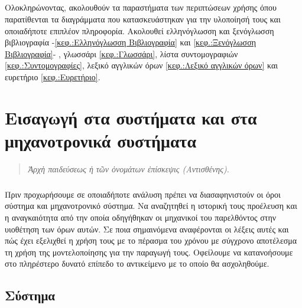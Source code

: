 \documentclass[a4paper,12pt,twoside]{report}
\begin{document}
		\paragraph{} {Ολοκληρώνοντας, ακολουθούν τα παραστήματα των περιπτώσεων χρήσης όπου παρατίθενται τα διαγράμματα που κατασκευάστηκαν για την υλοποίησή τους και οποιαδήποτε επιπλέον πληροφορία. Ακολουθεί ελληνόγλωσση και ξενόγλωσση βιβλιογραφία -\ref{κεφ.:Ελληνόγλωσση Βιβλιογραφία} και \ref{κεφ.:Ξενόγλωσση Βιβλιογραφία}- , γλωσσάρι \ref{κεφ.:Γλωσσάρι}, λίστα συντομογραφιών \ref{κεφ.:Συντομογραφίες}, λεξικό αγγλικών όρων \ref{κεφ.:Λεξικό αγγλικών όρων} και ευρετήριο \ref{κεφ.:Ευρετήριο}.
		}

	\chapter{Εισαγωγή στα συστήματα και στα μηχανοτρονικά συστήματα}
		\label{κεφ.:Εισαγωγή στα συστήματα και στα μηχανοτρονικά συστήματα}
		
		\begin{quote}
			\textit{Ἀρχὴ παιδεύσεως ἡ τῶν ὀνομάτων ἐπίσκεψις (Αντισθένης).}
		\end{quote}
		\paragraph{}{Πριν προχωρήσουμε σε οποιαδήποτε ανάλυση πρέπει να διασαφηνιστούν οι όροι σύστημα και μηχανοτρονικό σύστημα. Να αναζητηθεί η ιστορική τους προέλευση και η αναγκαιότητα από την οποία οδηγήθηκαν οι μηχανικοί του παρελθόντος στην υιοθέτηση των όρων αυτών. Σε ποια σημαινόμενα αναφέρονται οι λέξεις αυτές και πώς έχει εξελιχθεί η χρήση τους με το πέρασμα του χρόνου με σύγχρονο αποτέλεσμα τη χρήση της μοντελοποίησης για την παραγωγή τους. Οφείλουμε να κατανοήσουμε στο πληρέστερο δυνατό επίπεδο το αντικείμενο με το οποίο θα ασχοληθούμε.
		}

		\section{Σύστημα}
		
\end{document}
